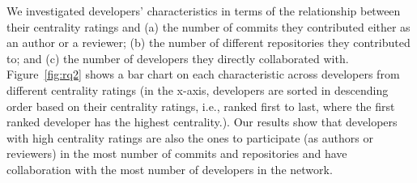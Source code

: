 \documentclass[10pt,journal,compsoc]{IEEEtran}
\begin{document}


We investigated developers' characteristics in terms of the relationship between their centrality ratings and (a) the number of commits they contributed either as an author or a reviewer; (b) the number of different repositories they contributed to; and (c)  the number of developers they directly collaborated with.  Figure~\ref{fig:rq2} shows a bar chart on each characteristic across developers from different centrality ratings (in the x-axis, developers are sorted in descending order based on their centrality ratings, i.e., ranked first to last, where the first ranked developer has the highest centrality.). Our results show that developers with high centrality ratings are also the ones to participate (as authors or reviewers) in the most number of commits and repositories and have collaboration with the most number of developers in the network. 
\end{document}
